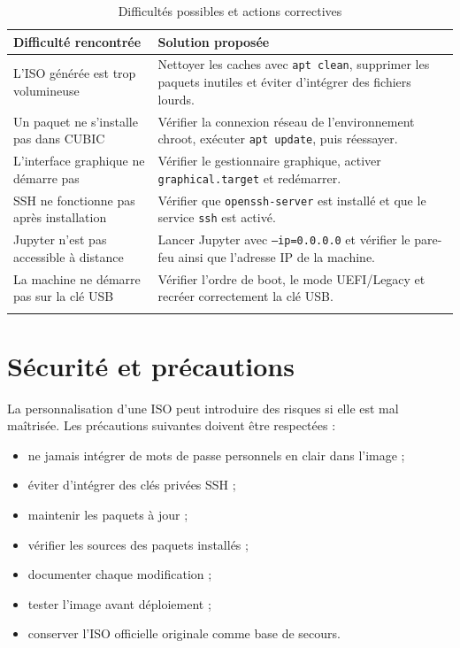 \documentclass[12pt,a4paper]{article}
\begin{document}
\begin{longtable}{p{5cm}p{9cm}}
\toprule
\textbf{Difficulté rencontrée} & \textbf{Solution proposée} \\
\midrule
L'ISO générée est trop volumineuse & Nettoyer les caches avec \texttt{apt clean}, supprimer les paquets inutiles et éviter d'intégrer des fichiers lourds. \\
\addlinespace
Un paquet ne s'installe pas dans CUBIC & Vérifier la connexion réseau de l'environnement chroot, exécuter \texttt{apt update}, puis réessayer. \\
\addlinespace
L'interface graphique ne démarre pas & Vérifier le gestionnaire graphique, activer \texttt{graphical.target} et redémarrer. \\
\addlinespace
SSH ne fonctionne pas après installation & Vérifier que \texttt{openssh-server} est installé et que le service \texttt{ssh} est activé. \\
\addlinespace
Jupyter n'est pas accessible à distance & Lancer Jupyter avec \texttt{--ip=0.0.0.0} et vérifier le pare-feu ainsi que l'adresse IP de la machine. \\
\addlinespace
La machine ne démarre pas sur la clé USB & Vérifier l'ordre de boot, le mode UEFI/Legacy et recréer correctement la clé USB. \\
\bottomrule
\caption{Difficultés possibles et actions correctives}
\end{longtable}

\section{Sécurité et précautions}

La personnalisation d'une ISO peut introduire des risques si elle est mal maîtrisée. Les précautions suivantes doivent être respectées :

\begin{itemize}[label=--]
    \item ne jamais intégrer de mots de passe personnels en clair dans l'image ;
    \item éviter d'intégrer des clés privées SSH ;
    \item maintenir les paquets à jour ;
    \item vérifier les sources des paquets installés ;
    \item documenter chaque modification ;
    \item tester l'image avant déploiement ;
    \item conserver l'ISO officielle originale comme base de secours.
\end{itemize}
\end{document}
